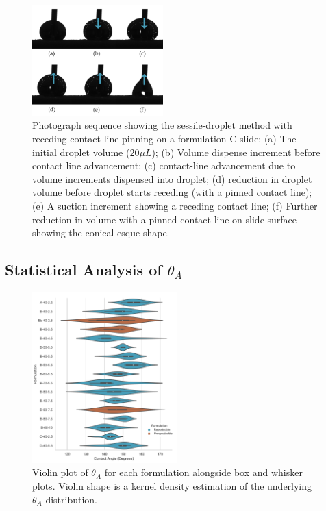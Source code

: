 \begin{figure}[h!]
\centering
  \includegraphics[width=0.45\textwidth]{Sections/Figures/sessile3.png}
  \caption{Photograph sequence showing the sessile-droplet method with receding contact line pinning on a formulation C slide\footnotemark: (a) The initial droplet volume ($20\mu L$); (b) Volume dispense increment before contact line advancement; (c) contact-line advancement due to volume increments dispensed into droplet; (d) reduction in droplet volume before droplet starts receding (with a pinned contact line); (e) A suction increment showing a receding contact line; (f) Further reduction in volume with a pinned contact line on slide surface showing the conical-esque shape.}\label{Cone}
\end{figure} 
\newpage
\subsection{Statistical Analysis of $\theta_A$}
\begin{figure}[h!]
\centering
  \includegraphics[width=0.5\textwidth]{Sections/Figures/tiny.png}
  \caption{Violin plot of $\theta_A$ for each formulation alongside box and whisker plots. Violin shape is a  kernel density estimation of the underlying $\theta_A$ distribution.}\label{CA}
\end{figure} 


